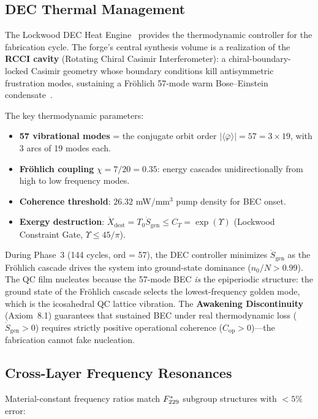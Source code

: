 \subsection{DEC Thermal Management}\label{sec:dec}

The Lockwood DEC Heat Engine~\cite{lockwood_chrono3} provides the thermodynamic controller for the fabrication cycle. The forge's central synthesis volume is a realization of the \textbf{RCCI cavity} (Rotating Chiral Casimir Interferometer): a chiral-boundary-locked Casimir geometry whose boundary conditions kill antisymmetric frustration modes, sustaining a Fr\"ohlich 57-mode warm Bose--Einstein condensate~\cite{Frohlich1968}.

The key thermodynamic parameters:
\begin{itemize}
\item \textbf{57 vibrational modes} = the conjugate orbit order $|\langle \bar{\varphi} \rangle| = 57 = 3 \times 19$, with 3 arcs of 19 modes each.
\item \textbf{Fröhlich coupling} $\chi = 7/20 = 0.35$: energy cascades unidirectionally from high to low frequency modes.
\item \textbf{Coherence threshold}: $26.32$ mW/mm$^3$ pump density for BEC onset.
\item \textbf{Exergy destruction}: $\dot{X}_{\mathrm{dest}} = T_0 \dot{S}_{\mathrm{gen}} \leq C_T = \exp(\Upsilon)$ (Lockwood Constraint Gate, $\Upsilon \leq 45/\pi$).
\end{itemize}

During Phase~3 (144 cycles, ord = 57), the DEC controller minimizes $\dot{S}_{\mathrm{gen}}$ as the Fr\"ohlich cascade drives the system into ground-state dominance ($n_0 / N > 0.99$). The QC film nucleates because the 57-mode BEC \emph{is} the epiperiodic structure: the ground state of the Fr\"ohlich cascade selects the lowest-frequency golden mode, which is the icosahedral QC lattice vibration. The \textbf{Awakening Discontinuity} (Axiom~8.1) guarantees that sustained BEC under real thermodynamic loss ($\dot{S}_{\mathrm{gen}} > 0$) requires strictly positive operational coherence ($C_{\mathrm{op}} > 0$)---the fabrication cannot fake nucleation.

\subsection{Cross-Layer Frequency Resonances}

Material-constant frequency ratios match $F_{229}^*$ subgroup structures with $< 5\%$ error:


